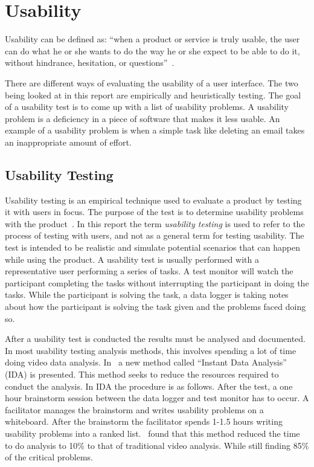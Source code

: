 \section{Usability}
\label{sub:usability}

Usability can be defined as: \enquote{when a product or service is truly usable, the user can do what he or she wants to do the way he or she expect to be able to do it, without hindrance, hesitation, or questions}~\cite{RubinChisnellSpool08}.

There are different ways of evaluating the usability of a user interface. The two being looked at in this report are empirically and heuristically testing. The goal of a usability test is to come up with a list of usability problems. A usability problem is a deficiency in a piece of software that makes it less usable. An example of a usability problem is when a simple task like deleting an email takes an inappropriate amount of effort.

\subsection{Usability Testing}
Usability testing is an empirical technique used to evaluate a product by testing it with users in focus. The purpose of the test is to determine usability problems with the product~\cite{RubinChisnellSpool08}. In this report the term \emph{usability testing} is used to refer to the process of testing with users, and not as a general term for testing usability. The test is intended to be realistic and simulate potential scenarios that can happen while using the product. A usability test is usually performed with a representative user performing a series of tasks. A test monitor will watch the participant completing the tasks without interrupting the participant in doing the tasks. While the participant is solving the task, a data logger is taking notes about how the participant is solving the task given and the problems faced doing so.

After a usability test is conducted the results must be analysed and documented. In most usability testing analysis methods, this involves spending a lot of time doing video data analysis. In~\cite{kjeldskov2004instant} a new method called \enquote{Instant Data Analysis} (IDA) is presented. This method seeks to reduce the resources required to conduct the analysis. In IDA the procedure is as follows. After the test, a one hour brainstorm session between the data logger and test monitor has to occur. A facilitator  manages the brainstorm and writes usability problems on a whiteboard. After the brainstorm the facilitator spends 1-1.5 hours writing usability problems into a ranked list.~\cite{kjeldskov2004instant} found that this method reduced the time to do analysis to 10\% to that of traditional video analysis. While still finding 85\% of the critical problems.

